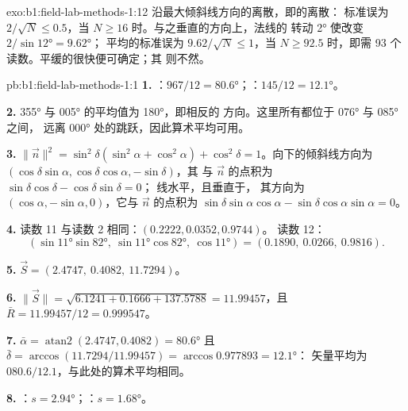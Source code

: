\begin{solution}{exo:b1:field-lab-methods-1:12}
沿最大倾斜线方向的离散，即的离散：
标准误为 $2/\sqrt N \le 0.5$，当 $N \ge 16$ 时。与之垂直的方向上，法线的
转动 \ang{2} 使改变 $2/\sin\ang{12} = \ang{9.62}$；
平均的标准误为 $9.62/\sqrt N \le 1$，当
$N \ge 92.5$ 时，即需 93 个读数。平缓的很快便可确定；其
则不然。
\end{solution}

\begin{solution}{pb:b1:field-lab-methods-1:1}
\textbf{1.} ：$967/12 = \ang{80.6}$；：$145/12 =
\ang{12.1}$。

\textbf{2.} \ang{355} 与 \ang{005} 的平均值为 \ang{180}，即相反的
方向。这里所有都位于 \ang{076} 与 \ang{085} 之间，
远离 \ang{000} 处的跳跃，因此算术平均可用。

\textbf{3.} $\|\vec n\|^2 =\allowbreak \sin^2\delta(\sin^2\alpha + \cos^2\alpha) +
\cos^2\delta = 1$。向下的倾斜线方向为
$(\cos\delta\sin\alpha,\allowbreak \cos\delta\cos\alpha,\allowbreak -\sin\delta)$，其
与 $\vec n$ 的点积为 $\sin\delta\cos\delta - \cos\delta\sin\delta = 0$；
线水平，且垂直于，
其方向为 $(\cos\alpha, -\sin\alpha, 0)$，它与 $\vec n$ 的点积为
$\sin\delta\sin\alpha\cos\alpha - \sin\delta\cos\alpha\sin\alpha = 0$。

\textbf{4.} 读数 11 与读数 2 相同：$(0.2222, 0.0352, 0.9744)$。
读数 12：
\[
  (\sin\ang{11}\sin\ang{82},\ \sin\ang{11}\cos\ang{82},\ \cos\ang{11}) =
  (0.1890,\ 0.0266,\ 0.9816).
\]

\textbf{5.} $\vec S = (2.4747,\ 0.4082,\ 11.7294)$。

\textbf{6.} $\|\vec S\| = \sqrt{6.1241 + 0.1666 + 137.5788} = 11.99457$，且
$\bar R = 11.99457/12 = 0.999547$。

\textbf{7.} $\bar\alpha = \operatorname{atan2}(2.4747, 0.4082) = \ang{80.6}$
且 $\bar\delta = \arccos(11.7294/11.99457) = \arccos 0.977893 = \ang{12.1}$：
矢量平均为 $080.6/12.1$，与此处的算术平均相同。

\textbf{8.} ：$s = \ang{2.94}$；：$s = \ang{1.68}$。


\end{solution}
